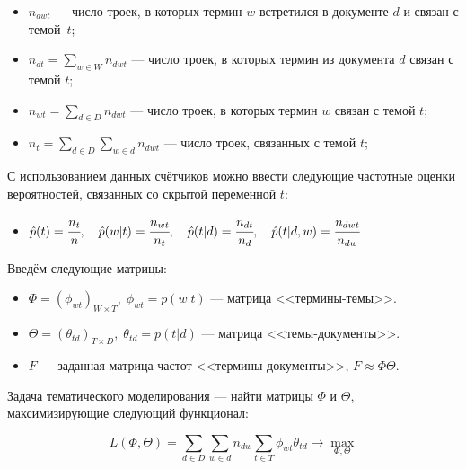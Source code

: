 \begin{itemize}
	\item $n_{dwt}$ --- число троек, в которых термин $w$ встретился в документе $d$ и связан с темой~$t$;
	\item $n_{dt} = \sum_{w \in W} n_{dwt}$ --- число троек, в которых термин из документа $d$ связан с темой $t$;
	\item $n_{wt} = \sum_{d \in D} n_{dwt}$ --- число троек, в которых термин $w$ связан с темой $t$;
	\item $n_t = \sum_{d \in D}\sum_{w \in d} n_{dwt}$ --- число троек, связанных с темой $t$;
\end{itemize}

С использованием данных счётчиков можно ввести следующие частотные оценки вероятностей, связанных со скрытой переменной $t$:

\begin{itemize}\label{label_1}
\item $\hat p(t) = \cfrac{n_t}{n}, \quad 
	\hat p(w|t) = \cfrac{n_{wt}}{n_t}, \quad
	\hat p(t|d) = \cfrac{n_{dt}}{n_d}, \quad
	\hat p(t|d,w) = \cfrac{n_{dwt}}{n_{dw}}$ 
\end{itemize}

Введём следующие матрицы:
\begin{itemize}
\item $\Phi = (\phi_{wt})_{W \times T}, \; \phi_{wt} = p(w|t)$ --- матрица <<термины-темы>>.
\item $\Theta = (\theta_{td})_{T \times D}, \; \theta_{td} = p(t|d)$ --- матрица <<темы-документы>>. 
\item $F$ --- заданная матрица частот <<термины-документы>>, $F \approx \Phi \Theta$.
\end{itemize}

Задача тематического моделирования --- найти матрицы $\Phi$ и $\Theta$, максимизирующие следующий функционал:

\begin{equation}\label{eq_1}
 	L(\Phi, \Theta) = \sum_{d \in D} \sum_{w \in d} n_{dw} \sum_{t \in T} \phi_{wt} \theta_{td} \rightarrow \max_{\Phi, \Theta}
\end{equation}

